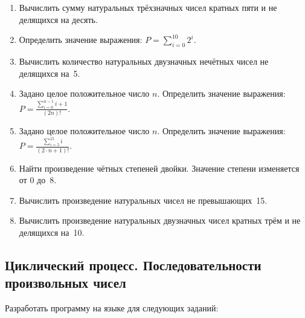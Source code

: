 \begin{enumerate}
\item Вычислить сумму натуральных трёхзначных чисел кратных пяти и не делящихся на десять.
\item Определить значение выражения:
 $P=\sum\limits_{i=0}^{10}2^{i}.$
\item Вычислить количество натуральных двузначных нечётных чисел не делящихся на~5.
\item Задано целое положительное число $n$. Определить значение выражения:
 $P=\frac{\sum\limits_{i=0}^{n-1}i+1}{(2n)!}.$
\item Задано целое положительное число $n$. Определить значение выражения:
 $P=\frac{\sum\limits_{i=5}^{15}i}{(2\cdot n+1)!}.$
\item Найти произведение чётных степеней двойки. Значение степени изменяется от 0 до~8.
\item Вычислить произведение натуральных чисел не превышающих~15.
\item Вычислить произведение натуральных двузначных чисел кратных трём и не делящихся на~10.
\end{enumerate}

\subsection[Циклический процесс. Последовательности произвольных чисел]{Циклический процесс. Последовательности
произвольных чисел}
Разработать программу на языке  для следующих заданий:

